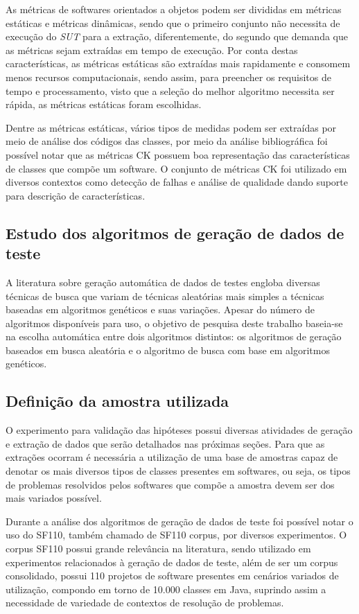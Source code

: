 \documentclass[
	12pt,				%
	oneside,			%
	a4paper,			%
	english,			%
	brazil				%
	]{abntex2ppgsi}
\begin{document}
As métricas de softwares orientados a objetos podem ser divididas em métricas estáticas e métricas dinâmicas, sendo que o primeiro conjunto não necessita de execução do \textit{SUT} para a extração, diferentemente, do segundo que demanda que as métricas sejam extraídas em tempo de execução. Por conta destas características, as métricas estáticas são extraídas mais rapidamente e consomem menos recursos computacionais, sendo assim, 
para preencher os requisitos de tempo e processamento, visto que a seleção do melhor algoritmo necessita ser rápida, as métricas estáticas foram escolhidas.

Dentre as métricas estáticas, vários tipos de medidas podem ser extraídas por meio de análise dos códigos das classes, por meio da análise bibliográfica foi possível notar que as métricas CK possuem boa representação das características de classes que compõe um software. O conjunto de métricas CK foi utilizado em diversos contextos como detecção de falhas e análise de qualidade dando suporte para descrição de características.

\subsection{Estudo dos algoritmos de geração de dados de teste}
A literatura sobre geração automática de dados de testes engloba diversas técnicas de busca que variam de técnicas aleatórias mais simples a técnicas baseadas em algoritmos genéticos e suas variações. Apesar do número de algoritmos disponíveis para uso, o objetivo de pesquisa deste trabalho baseia-se na escolha automática entre dois algoritmos distintos: os algoritmos de geração baseados em busca aleatória e o algoritmo de busca  com base em algoritmos genéticos.



\subsection{Definição da amostra utilizada}
O experimento para validação das hipóteses possui diversas atividades de geração e extração de dados que serão detalhados nas próximas seções. Para que as extrações ocorram é necessária a utilização de uma base de amostras capaz de denotar os mais diversos tipos de classes presentes em softwares, ou seja, os tipos de problemas resolvidos pelos softwares que compõe a amostra devem ser dos mais variados possível.

Durante a análise dos algoritmos de geração de dados de teste foi possível notar o uso do SF110, também chamado de SF110 corpus, por diversos experimentos. O corpus SF110 possui grande relevância na literatura, sendo utilizado em experimentos relacionados à geração de dados de teste, além de ser um corpus consolidado, possui 110 projetos de software presentes em cenários variados de utilização, compondo em torno de 10.000 classes em Java, suprindo assim a necessidade de variedade de contextos de resolução de problemas.
\end{document}
